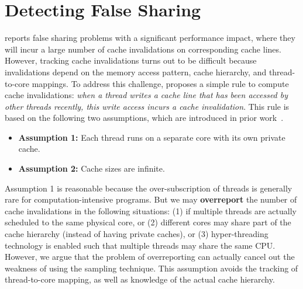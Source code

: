 \section{Detecting False Sharing}
\label{sec:detect}

\cheetah{} reports false sharing problems with a significant performance impact, where they will incur a large number of cache invalidations on corresponding cache lines. However, tracking cache invalidations turns out to be difficult because invalidations depend on the memory access pattern, cache hierarchy, and thread-to-core mappings. 
To address this challenge, \cheetah{} proposes a simple rule to compute cache invalidations: \emph{when a thread writes a cache line that has been accessed by other threads recently, this write access incurs a cache invalidation}. This rule is based on the following two assumptions, which are introduced in prior work~\cite{Predator, qinzhao}. 
 

\begin{itemize} 
\item {\bf Assumption 1:} Each thread runs on a separate core with its own private cache. 

\item {\bf Assumption 2:} Cache sizes are infinite. 
 
\end{itemize}

Assumption 1 is reasonable because the over-subscription of threads is generally rare for computation-intensive programs. But we may {\bf overreport} the number of cache invalidations in the following situations: (1) if multiple threads are actually scheduled to the same physical core, or (2) different cores may share part of the cache hierarchy (instead of having private caches), or (3) hyper-threading technology is enabled such that multiple threads may share the same CPU. However, we argue that the problem of overreporting can actually cancel out the weakness of using the sampling technique. 
This assumption avoids the tracking of thread-to-core mapping, as well as knowledge of the actual cache hierarchy.

